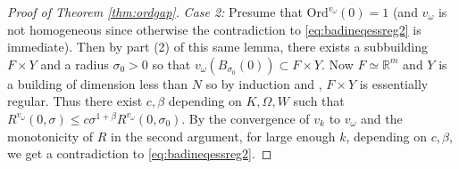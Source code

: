 \documentclass[12pt]{amsart}
\theoremstyle{definition}
\numberwithin{equation}{section}
\newcommand{\R}{\mathbb R}
\newcommand{\FY}{F \times Y}
\begin{document}
\begin{proof}[Proof of Theorem \ref{thm:ordgap}]
\emph{Case 2:} Presume that $\text{Ord}^{v_\omega}(0)=1$ (and $v_\omega$ is not homogeneous since otherwise the contradiction to \eqref{eq:badineqessreg2} is immediate). Then by part (2) of this same lemma, there exists a subbuilding $\FY$ and a radius $\sigma_0>0$ so that $v_\omega(B_{\sigma_0}(0)) \subset \FY$. Now $F \simeq \R^m$ and $Y$ is a building of dimension less than $N$ so by induction and \cite[Lemma 6.1]{gromov-schoen}, $\FY$ is essentially regular. Thus there exist $c, \beta$ depending on $K, \Omega, W$ such that $R^{v_\omega}(0,\sigma) \leq c \sigma^{1+\beta}R^{v_\omega}(0,\sigma_0)$. By the convergence of $v_k$ to $v_\omega$ and the monotonicity of $R$ in the second argument, for large enough $k$, depending on $c, \beta$, we get a contradiction to \eqref{eq:badineqessreg2}.
\end{proof}
\end{document}
